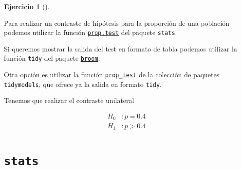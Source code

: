 \documentclass[
  a4paper,
]{scrreport}
\newenvironment{Shaded}{\begin{snugshade}}{\end{snugshade}}
\newcommand{\AttributeTok}[1]{\textcolor[rgb]{0.40,0.45,0.13}{#1}}
\newcommand{\FloatTok}[1]{\textcolor[rgb]{0.68,0.00,0.00}{#1}}
\newcommand{\FunctionTok}[1]{\textcolor[rgb]{0.28,0.35,0.67}{#1}}
\newcommand{\NormalTok}[1]{\textcolor[rgb]{0.00,0.23,0.31}{#1}}
\newcommand{\OtherTok}[1]{\textcolor[rgb]{0.00,0.23,0.31}{#1}}
\newcommand{\SpecialCharTok}[1]{\textcolor[rgb]{0.37,0.37,0.37}{#1}}
\newcommand{\StringTok}[1]{\textcolor[rgb]{0.13,0.47,0.30}{#1}}
\theoremstyle{definition}
\newtheorem{exercise}{Ejercicio}[chapter]
\theoremstyle{remark}
\begin{document}
\begin{exercise}[]
\begin{enumerate}
\begin{tcolorbox}
  Para realizar un contraste de hipótesis para la proporción de una
  población podemos utilizar la función
  \href{https://www.rdocumentation.org/packages/stats/versions/3.6.2/topics/prop.test}{\texttt{prop.test}}
  del paquete \texttt{stats}.

  Si queremos mostrar la salida del test en formato de tabla podemos
  utilizar la función \texttt{tidy} del paquete
  \href{https://broom.tidymodels.org/index.html}{\texttt{broom}}.

  Otra opción es utilizar la función
  \href{https://infer.tidymodels.org/reference/prop_test.html}{\texttt{prop\_test}}
  de la colección de paquetes \texttt{tidymodels}, que ofrece ya la
  salida en formato \texttt{tidy}.

  \end{tcolorbox}

  \begin{tcolorbox}[enhanced jigsaw, breakable, toptitle=1mm, colbacktitle=quarto-callout-tip-color!10!white, rightrule=.15mm, opacityback=0, opacitybacktitle=0.6, titlerule=0mm, coltitle=black, colframe=quarto-callout-tip-color-frame, colback=white, bottomtitle=1mm, leftrule=.75mm, toprule=.15mm, title=\textcolor{quarto-callout-tip-color}{\faLightbulb}\hspace{0.5em}{Solución}, arc=.35mm, bottomrule=.15mm, left=2mm]

  Tenemos que realizar el contraste unilateral

  \begin{align*}
  H_0 &: p = 0.4\\
  H_1 &: p > 0.4 
  \end{align*}

  \section{\texorpdfstring{\texttt{stats}}{stats}}

\begin{Shaded}
\end{Shaded}


\end{tcolorbox}
\end{enumerate}
\end{exercise}
\end{document}
